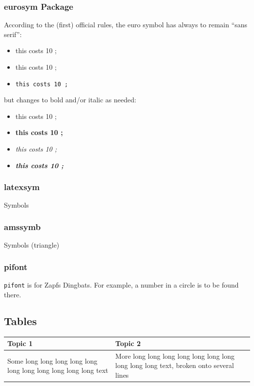 \documentclass{boostreport}
\begin{document}
\subsubsection{eurosym Package}
\label{sec:eurosym-package}

According to the (first) official rules, the euro symbol has always to
remain ``sans serif'':

\begin{itemize}
    \item this costs 10 \texteuro;
    \item \textsf{this costs 10 \texteuro;}
    \item \texttt{this costs 10 \texteuro;}
\end{itemize}

but changes to bold and/or italic as needed:

\begin{itemize}
    \item this costs 10 \texteuro;
    \item \textbf{this costs 10 \texteuro;}
    \item \textit{this costs 10 \texteuro;}
    \item \textit{\textbf{this costs 10 \texteuro;}}
\end{itemize}

\subsubsection{latexsym}

Symbols

\subsubsection{amssymb}

Symbols (triangle)

\subsubsection{pifont}

\texttt{pifont} is for Zapfs Dingbats. For example, a number in a circle is
to be found there.

\subsection{Tables}
\label{sec:tables}

\begin{tabular}{|l|p{4cm}|} \hline
    Topic 1 & Topic 2 \\
    \hline
    Some long long long long long long long long long long long text &
    More long long long long long long long long long long text, broken onto
    several lines\\
    \hline
\end{tabular}
\end{document}
